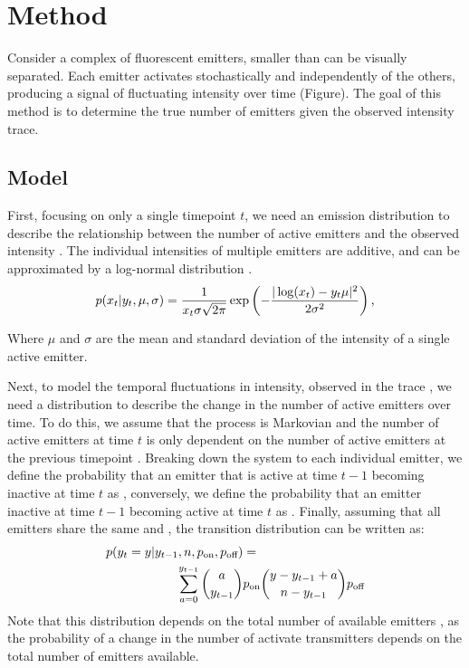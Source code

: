 \section{Method}

Consider a complex of fluorescent emitters, smaller than can be visually separated. Each emitter activates stochastically and independently of the others, producing a signal of fluctuating intensity over time (Figure).
The goal of this method is to determine the true number of emitters \truen given the observed intensity trace.

\subsection{Model}

First, focusing on only a single timepoint $t$, we need an emission distribution to describe the relationship between the number of active emitters  and the observed intensity . The individual intensities of multiple emitters are additive, and can be approximated by a log-normal distribution \cite{mutch_deconvolving_2007} \ie.
%
\begin{equation*}
  p(x_{t}|y_{t}, \mu, \sigma) =
    \frac{1}{x_{t}\sigma\sqrt{2\pi}}
    \exp \left(
      - \frac{|\log(x_{t}) - y_{t}\mu|^2}{2\sigma^2}
    \right)
  \text{,}
\end{equation*}

Where $\mu$ and $\sigma$ are the mean and standard deviation of the intensity of a single active emitter.

Next, to model the temporal fluctuations in intensity, observed in the trace \trace, we need a distribution to describe the change in the number of active emitters \states over time. To do this, we assume that the process is Markovian and the number of active emitters  at time $t$ is only dependent on the number of active emitters at the previous timepoint . Breaking down the system to each individual emitter, we define the probability that an emitter that is active at time $t-1$ becoming inactive at time $t$ as \poff, conversely, we define the probability that an emitter inactive at time $t-1$ becoming active at time $t$ as \pon. Finally, assuming that all emitters share the same \poff and \pon, the transition distribution can be written as:
%
\begin{align*}
  p(\y{t} = y | \y{t-1}, \n, \pon, \poff) &=\\
	\sum_{a = 0}^{\y{t-1}}
    {a \choose \y{t-1}}
    &\pon
    {y - \y{t-1} + a \choose \n - \y{t-1}}
    \poff
\end{align*}
%
Note that this distribution depends on the total number of available emitters
\n, as the probability of a change in the number of activate transmitters
depends on the total number of emitters available.

